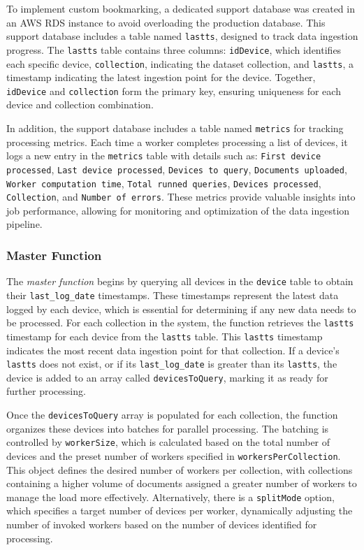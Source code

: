 To implement custom bookmarking, a dedicated support database was created in an AWS RDS instance to avoid overloading the production database. This support database includes a table named \texttt{lastts}, designed to track data ingestion progress. The \texttt{lastts} table contains three columns: \texttt{idDevice}, which identifies each specific device, \texttt{collection}, indicating the dataset collection, and \texttt{lastts}, a timestamp indicating the latest ingestion point for the device. Together, \texttt{idDevice} and \texttt{collection} form the primary key, ensuring uniqueness for each device and collection combination.

In addition, the support database includes a table named \texttt{metrics} for tracking processing metrics. Each time a worker completes processing a list of devices, it logs a new entry in the \texttt{metrics} table with details such as: \texttt{First device processed}, \texttt{Last device processed}, \texttt{Devices to query}, \texttt{Documents uploaded}, \texttt{Worker computation time}, \texttt{Total runned queries}, \texttt{Devices processed}, \texttt{Collection}, and \texttt{Number of errors}. These metrics provide valuable insights into job performance, allowing for monitoring and optimization of the data ingestion pipeline.

\subsubsection{Master Function}

The \textit{master function} begins by querying all devices in the \texttt{device} table to obtain their \texttt{last\_log\_date} timestamps. These timestamps represent the latest data logged by each device, which is essential for determining if any new data needs to be processed. For each collection in the system, the function retrieves the \texttt{lastts} timestamp for each device from the \texttt{lastts} table. This \texttt{lastts} timestamp indicates the most recent data ingestion point for that collection. If a device’s \texttt{lastts} does not exist, or if its \texttt{last\_log\_date} is greater than its \texttt{lastts}, the device is added to an array called \texttt{devicesToQuery}, marking it as ready for further processing.

Once the \texttt{devicesToQuery} array is populated for each collection, the function organizes these devices into batches for parallel processing. The batching is controlled by \texttt{workerSize}, which is calculated based on the total number of devices and the preset number of workers specified in \texttt{workersPerCollection}. This object defines the desired number of workers per collection, with collections containing a higher volume of documents assigned a greater number of workers to manage the load more effectively. Alternatively, there is a \texttt{splitMode} option, which specifies a target number of devices per worker, dynamically adjusting the number of invoked workers based on the number of devices identified for processing.

